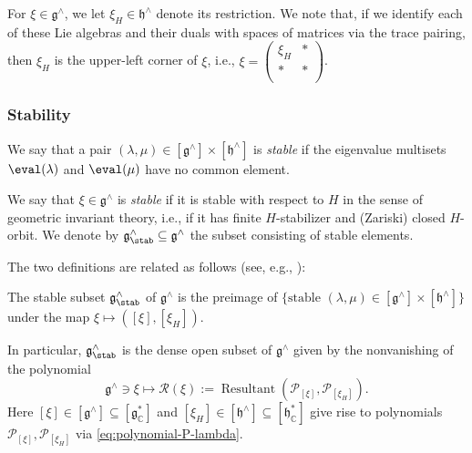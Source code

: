 For $\xi \in \mathfrak{g}^\wedge$, we let $\xi_H \in \mathfrak{h}^\wedge$ denote its restriction.  We note that, if we identify each of these Lie algebras and their duals with spaces of matrices via the trace pairing, then $\xi_H$ is the upper-left corner of $\xi$, i.e., $\xi = \left(
  \begin{smallmatrix}
    \xi_H&\ast\\
    \ast       &\ast \\
  \end{smallmatrix}
\right)$.

\subsubsection{Stability}\label{sec:stability}

\begin{definition}
  We say that a pair $(\lambda, \mu ) \in [\mathfrak{g} ^\wedge ] \times [\mathfrak{h} ^\wedge ]$ is \emph{stable} if the eigenvalue multisets $\eval(\lambda)$ and $\eval(\mu)$ have no common element.
\end{definition}

\begin{definition}
  We say that $\xi \in \mathfrak{g}^\wedge$ is \emph{stable}    if it is stable with respect to $H$ in the sense of geometric invariant theory, i.e., if it has finite $H$-stabilizer and (Zariski) closed $H$-orbit.  We denote by $\mathfrak{g}^\wedge_{\stab} \subseteq \mathfrak{g}^\wedge$ the subset consisting of stable elements.
\end{definition}

The two definitions are related as follows (see, e.g., \cite[Lemma 11.4]{2020arXiv201202187N}):
\begin{lemma}
  The stable subset $\mathfrak{g}^\wedge_{\stab}$ of $\mathfrak{g}^\wedge$ is the preimage of $\{\text{stable } (\lambda, \mu ) \in [\mathfrak{g}^\wedge] \times [\mathfrak{h}^\wedge]\}$ under the map $\xi \mapsto ([\xi], [\xi_H])$.
\end{lemma}
In particular, $\mathfrak{g}^\wedge_{\stab}$ is the dense open subset of $\mathfrak{g}^\wedge$ given by the nonvanishing of the polynomial
\begin{equation*}
  \mathfrak{g}^\wedge  \ni \xi \mapsto \mathcal{R}(\xi) := \operatorname{Resultant} (\mathcal{P}_{[\xi]}, \mathcal{P}_{[\xi_H]}).
\end{equation*}
Here $[\xi] \in [\mathfrak{g}^\wedge] \subseteq [\mathfrak{g}_{\mathbb{C}}^*]$ and $[\xi_H] \in [\mathfrak{h}^\wedge] \subseteq [\mathfrak{h}_{\mathbb{C}}^*]$ give rise to polynomials $\mathcal{P}_{[\xi]}, \mathcal{P}_{[\xi_H]}$ via \eqref{eq:polynomial-P-lambda}.

